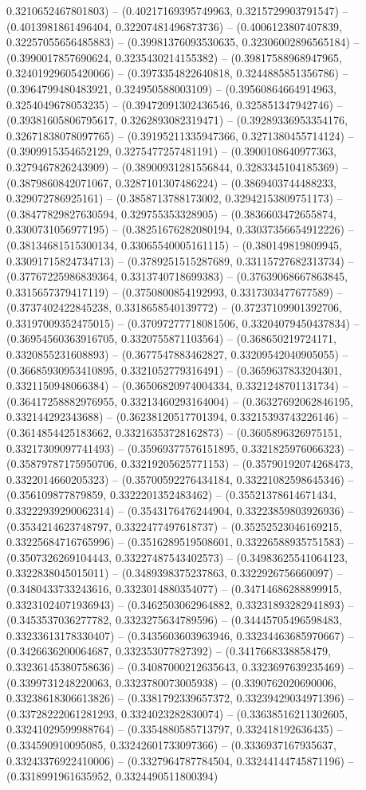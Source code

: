 0.3210652467801803) -- (0.40217169395749963, 0.3215729903791547) -- (0.4013981861496404, 0.32207481496873736) -- (0.4006123807407839, 0.32257055656485883) -- (0.39981376093530635, 0.32306002896565184) -- (0.3990017857690624, 0.3235430214155382) -- (0.39817588968947965, 0.32401929605420066) -- (0.3973354822640818, 0.3244885851356786) -- (0.3964799480483921, 0.324950588003109) -- (0.39560864664914963, 0.3254049678053235) -- (0.39472091302436546, 0.325851347942746) -- (0.39381605806795617, 0.3262893082319471) -- (0.39289336953354176, 0.32671838078097765) -- (0.39195211335947366, 0.3271380455714124) -- (0.3909915354652129, 0.3275477257481191) -- (0.3900108640977363, 0.3279467826243909) -- (0.38900931281556844, 0.3283345104185369) -- (0.3879860842071067, 0.3287101307486224) -- (0.3869403744488233, 0.329072786925161) -- (0.3858713788173002, 0.32942153809751173) -- (0.38477829827630594, 0.329755353328905) -- (0.3836603472655874, 0.3300731056977195) -- (0.38251676282080194, 0.33037356654912226) -- (0.38134681515300134, 0.33065540005161115) -- (0.380149819809945, 0.33091715824734713) -- (0.3789251515287689, 0.33115727682313734) -- (0.37767225986839364, 0.3313740718699383) -- (0.37639068667863845, 0.3315657379417119) -- (0.3750800854192993, 0.3317303477677589) -- (0.3737402422845238, 0.3318658540139772) -- (0.37237109901392706, 0.33197009352475015) -- (0.37097277718081506, 0.33204079450437834) -- (0.36954560363916705, 0.3320755871103564) -- (0.368650219724171, 0.3320855231608893) -- (0.3677547883462827, 0.33209542040905055) -- (0.36685930953410895, 0.3321052779316491) -- (0.3659637833204301, 0.3321150948066384) -- (0.36506820974004334, 0.3321248701131734) -- (0.36417258882976955, 0.33213460293164004) -- (0.36327692062846195, 0.332144292343688) -- (0.36238120517701394, 0.33215393743226146) -- (0.3614854425183662, 0.33216353728162873) -- (0.3605896326975151, 0.33217309097741493) -- (0.35969377576151895, 0.3321825976066323) -- (0.35879787175950706, 0.33219205625771153) -- (0.35790192074268473, 0.3322014660205323) -- (0.35700592276434184, 0.33221082598645346) -- (0.356109877879859, 0.3322201352483462) -- (0.35521378614671434, 0.33222939290062314) -- (0.3543176476244904, 0.33223859803926936) -- (0.3534214623748797, 0.3322477497618737) -- (0.35252523046169215, 0.33225684716765996) -- (0.3516289519508601, 0.33226588935751583) -- (0.3507326269104443, 0.33227487543402573) -- (0.34983625541064123, 0.3322838045015011) -- (0.3489398375237863, 0.3322926756660097) -- (0.3480433733243616, 0.3323014880354077) -- (0.34714686288899915, 0.33231024071936943) -- (0.3462503062964882, 0.33231893282941893) -- (0.3453537036277782, 0.3323275634789596) -- (0.34445705496598483, 0.33233613178330407) -- (0.3435603603963946, 0.33234463685970667) -- (0.3426636200064687, 0.332353077827392) -- (0.3417668338858479, 0.33236145380758636) -- (0.34087000212635643, 0.3323697639235469) -- (0.3399731248220063, 0.3323780073005938) -- (0.3390762020690006, 0.33238618306613826) -- (0.3381792339657372, 0.33239429034971396) -- (0.33728222061281293, 0.3324023282830074) -- (0.33638516211302605, 0.33241029599988764) -- (0.3354880585713797, 0.332418192636435) -- (0.334590910095085, 0.33242601733097366) -- (0.3336937167935637, 0.33243376922410006) -- (0.3327964787784504, 0.33244144745871196) -- (0.3318991961635952, 0.3324490511800394) 